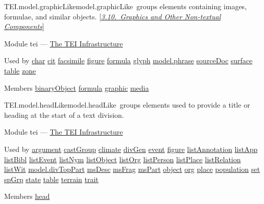 \begin{reflist}
\item[]\begin{specHead}{TEI.model.graphicLike}{model.graphicLike} groups elements containing images, formulae, and similar objects. [\textit{\hyperref[COGR]{3.10.\ Graphics and Other Non-textual Components}}]\end{specHead} 
    \item[{Module}]
  tei — \hyperref[ST]{The TEI Infrastructure}
    \item[{Used by}]
  \hyperref[TEI.char]{char} \hyperref[TEI.cit]{cit} \hyperref[TEI.facsimile]{facsimile} \hyperref[TEI.figure]{figure} \hyperref[TEI.formula]{formula} \hyperref[TEI.glyph]{glyph} \hyperref[TEI.model.phrase]{model.phrase} \hyperref[TEI.sourceDoc]{sourceDoc} \hyperref[TEI.surface]{surface} \hyperref[TEI.table]{table} \hyperref[TEI.zone]{zone}
    \item[{Members}]
  \hyperref[TEI.binaryObject]{binaryObject} \hyperref[TEI.formula]{formula} \hyperref[TEI.graphic]{graphic} \hyperref[TEI.media]{media}
\end{reflist}  
\begin{reflist}
\item[]\begin{specHead}{TEI.model.headLike}{model.headLike} groups elements used to provide a title or heading at the start of a text division.\end{specHead} 
    \item[{Module}]
  tei — \hyperref[ST]{The TEI Infrastructure}
    \item[{Used by}]
  \hyperref[TEI.argument]{argument} \hyperref[TEI.castGroup]{castGroup} \hyperref[TEI.climate]{climate} \hyperref[TEI.divGen]{divGen} \hyperref[TEI.event]{event} \hyperref[TEI.figure]{figure} \hyperref[TEI.listAnnotation]{listAnnotation} \hyperref[TEI.listApp]{listApp} \hyperref[TEI.listBibl]{listBibl} \hyperref[TEI.listEvent]{listEvent} \hyperref[TEI.listNym]{listNym} \hyperref[TEI.listObject]{listObject} \hyperref[TEI.listOrg]{listOrg} \hyperref[TEI.listPerson]{listPerson} \hyperref[TEI.listPlace]{listPlace} \hyperref[TEI.listRelation]{listRelation} \hyperref[TEI.listWit]{listWit} \hyperref[TEI.model.divTopPart]{model.divTopPart} \hyperref[TEI.msDesc]{msDesc} \hyperref[TEI.msFrag]{msFrag} \hyperref[TEI.msPart]{msPart} \hyperref[TEI.object]{object} \hyperref[TEI.org]{org} \hyperref[TEI.place]{place} \hyperref[TEI.population]{population} \hyperref[TEI.set]{set} \hyperref[TEI.spGrp]{spGrp} \hyperref[TEI.state]{state} \hyperref[TEI.table]{table} \hyperref[TEI.terrain]{terrain} \hyperref[TEI.trait]{trait}
    \item[{Members}]
  \hyperref[TEI.head]{head}
\end{reflist}  
